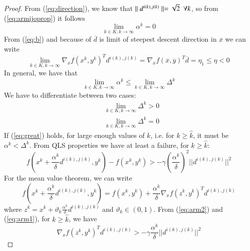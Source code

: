 \begin{proof}
From (\ref{eq:direction}), we know that $\parallel d^{i(k),j(k)} \parallel = \sqrt{2} \enskip\forall k$, so from (\ref{eq:armijoprop}) it follows
\begin{equation}\label{eq:alpha}%
\lim_{k \in K, k \rightarrow \infty} \alpha^{k}=0
\end{equation}
From (\ref{eq:b}) and because of $\overline{d}$ is limit of steepest descent direction in $\overline{x}$  we can write
\begin{equation}\label{eq:wrong}
\lim_{k \in K, k \rightarrow \infty} \nabla_x f(x^k, y^k)^T d^{i(k),j(k)} = \nabla_x f(\overline{x},\overline{y})^T \overline{d} = \eta_1 \le \eta < 0
\end{equation}
In general, we have that
\begin{equation}
\lim_{k \in K, k \rightarrow \infty} \alpha^k \leq \lim_{k \in K, k \rightarrow \infty} \Delta^k
\end{equation}
We have to differentiate between two cases:
\begin{subequations}
\begin{align}
& \lim_{k \in K, k \rightarrow \infty} \Delta^k > 0 \label{eq:great}\\
& \lim_{k \in K, k \rightarrow \infty} \Delta^k = 0 \label{eq:zero}
\end{align}
\end{subequations}
If (\ref{eq:great}) holds, for large enough values of $k$, i.e. for $k \geq \hat{k}$, it must be $\alpha^k < \Delta^k$. From QLS properties we have at least a failure, for $k \geq \hat{k}$:
\begin{equation}\label{eq:arm1}
f(x^k + \frac{\alpha^k}{\delta} d^{i(k),j(k)}, y^k) - f(x^k,y^k) > -\gamma \left(\frac{\alpha^k}{\delta}\right)^2 ||d^{i(k),j(k)}||^2
\end{equation}
For the mean value theorem, we can write
\begin{equation}\label{eq:arm2}
f(x^k + \frac{\alpha^k}{\delta} d^{i(k),j(k)}, y^k) = f(x^k, y^k) + \frac{\alpha^k}{\delta} \nabla_x f(z^k, y^k)^T d^{i(k),j(k)}
\end{equation}
where $z^k = x^k + \vartheta_k \frac{\alpha^k}{\delta} d^{i(k),j(k)}$ and $\vartheta_k \in (0,1)$. From (\ref{eq:arm2}) and (\ref{eq:arm1}), for $k \geq \hat{k}$, we have
\begin{equation}\label{eq:nabla}
\nabla_x f(z^k, y^k)^T d^{i(k),j(k)}  >- \gamma \frac{\alpha^k}{\delta} ||d^{i(k),j(k)}||^2

\end{equation}
\end{proof}
